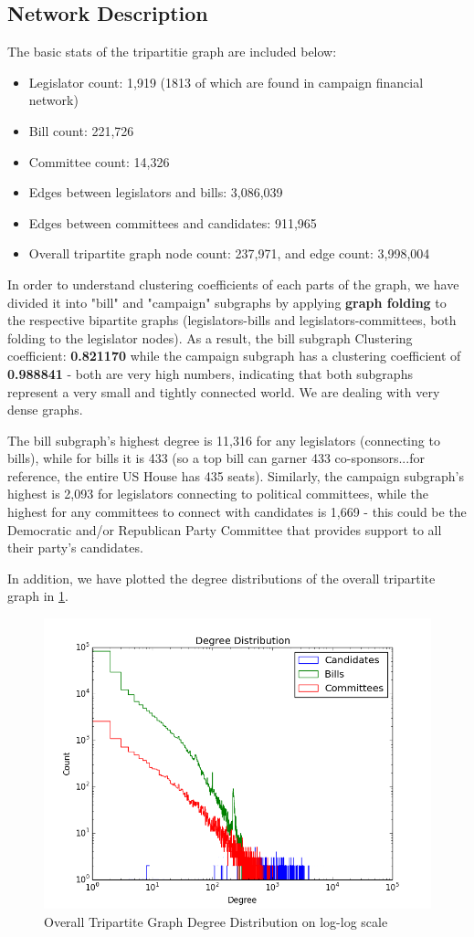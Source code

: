 \documentclass[12pt,twocolumn]{article}
\begin{document}
\subsection{Network Description}
The basic stats of the tripartitie graph are included below: 
\begin{itemize}
\item Legislator count: 1,919 (1813 of which are found in campaign financial network)
\item Bill count: 221,726 
\item Committee count: 14,326
\item Edges between legislators and bills: 3,086,039
\item Edges between committees and candidates: 911,965
\item Overall tripartite graph node count: 237,971, and edge count: 3,998,004
\end{itemize}

In order to understand clustering coefficients of each parts of the graph, we have divided it into "bill" and "campaign" subgraphs by applying \textbf{graph folding} to the respective bipartite graphs (legislators-bills and legislators-committees, both folding to the legislator nodes). As a result, the bill subgraph Clustering coefficient: \textbf{0.821170} while the campaign subgraph has a clustering coefficient of \textbf{0.988841} - both are very high numbers, indicating that both subgraphs represent a very small and tightly connected world. We are dealing with very dense graphs. 

The bill subgraph's highest degree is 11,316 for any legislators (connecting to bills), while for bills it is 433 (so a top bill can garner 433 co-sponsors...for reference, the entire US House has 435 seats). Similarly, the campaign subgraph's highest is 2,093 for legislators connecting to political committees, while the highest for any committees to connect with candidates is 1,669 - this could be the Democratic and/or Republican Party Committee that provides support to all their party's candidates. 

In addition, we have plotted the degree distributions of the overall tripartite graph in \ref{fig:overalldegdistro}. 
\begin{figure}
\centering
\includegraphics[width=0.5\linewidth]{overall_deg_distro}
\caption{Overall Tripartite Graph Degree Distribution on log-log scale}
\label{fig:overalldegdistro}
\end{figure}
\end{document}
